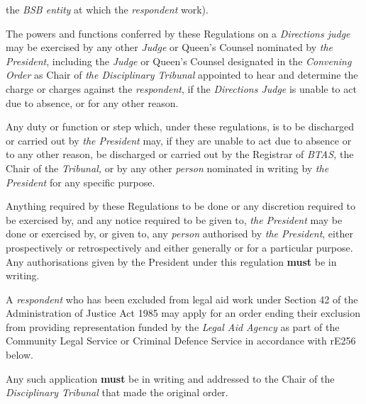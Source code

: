 the \emph{BSB entity} at which the \emph{respondent} work).\\
\par
{}
The powers and functions conferred by these Regulations on
a \emph{Directions judge} may be exercised by any other \emph{Judge} or
Queen's Counsel nominated by \emph{the President}, including
the \emph{Judge} or Queen's Counsel designated in the \emph{Convening
Order} as Chair of\emph{ the Disciplinary Tribunal} appointed to hear
and determine the charge or charges against the \emph{respondent}, if
the \emph{Directions Judge} is unable to act due to absence, or for any
other reason.\\
\par
Any duty or function or step which, under these regulations, is to be
discharged or carried out by \emph{the President} may, if they are
unable to act due to absence or to any other reason, be discharged or
carried out by the Registrar of \emph{BTAS, }the Chair of
the \emph{Tribunal, }or by any other \emph{person }nominated in writing
by \emph{the President }for any specific purpose.\\
\par
Anything required by these Regulations to be done or any discretion
required to be exercised by, and any notice required to be given
to, \emph{the President} may be done or exercised by, or given to,
any \emph{person} authorised by \emph{the President}, either
prospectively or retrospectively and either generally or for a
particular purpose. Any authorisations given by the President under this
regulation  \textcolor{myred}{\textbf{must}} be in writing.\\
\par
{}
A \emph{respondent} who has been excluded from legal aid work under
Section 42 of the Administration of Justice Act 1985 may apply for an
order ending their exclusion from providing representation funded by
the \emph{Legal Aid Agency} as part of the Community Legal Service or
Criminal Defence Service in accordance with rE256 below.\\
\par
Any such application  \textcolor{myred}{\textbf{must}} be in writing and addressed to the Chair of
the\emph{ Disciplinary Tribunal }that made the original order.\\
